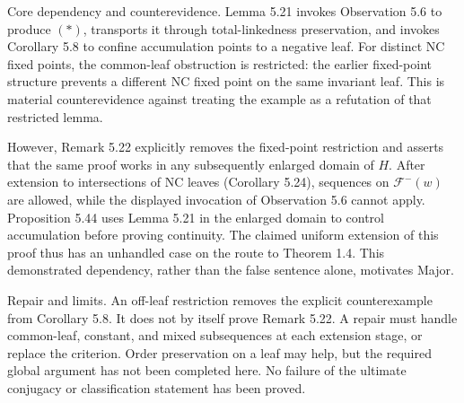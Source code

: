 \documentclass[10pt]{article}
\begin{document}
Core dependency and counterevidence. Lemma 5.21 invokes Observation 5.6 to produce \((*)\), transports it through total-linkedness preservation, and invokes Corollary 5.8 to confine accumulation points to a negative leaf. For distinct NC fixed points, the common-leaf obstruction is restricted: the earlier fixed-point structure prevents a different NC fixed point on the same invariant leaf. This is material counterevidence against treating the example as a refutation of that restricted lemma.\par
However, Remark 5.22 explicitly removes the fixed-point restriction and asserts that the same proof works in any subsequently enlarged domain of \(H\). After extension to intersections of NC leaves (Corollary 5.24), sequences on \(\mathcal F^-(w)\) are allowed, while the displayed invocation of Observation 5.6 cannot apply. Proposition 5.44 uses Lemma 5.21 in the enlarged domain to control accumulation before proving continuity. The claimed uniform extension of this proof thus has an unhandled case on the route to Theorem 1.4. This demonstrated dependency, rather than the false sentence alone, motivates Major.\par
Repair and limits. An off-leaf restriction removes the explicit counterexample from Corollary 5.8. It does not by itself prove Remark 5.22. A repair must handle common-leaf, constant, and mixed subsequences at each extension stage, or replace the criterion. Order preservation on a leaf may help, but the required global argument has not been completed here. No failure of the ultimate conjugacy or classification statement has been proved.\par
\end{document}
